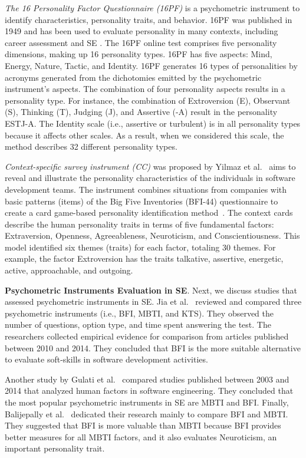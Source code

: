 \textit{The 16 Personality Factor Questionnaire (16PF)} is a psychometric instrument to identify characteristics, personality traits, and behavior. 16PF was published in 1949 and has been used to evaluate personality in many contexts, including career assessment and SE \cite{gomesevaluating}. The 16PF online test comprises five personality dimensions, making up 16 personality types. 16PF has five aspects: Mind, Energy, Nature, Tactic, and Identity. 16PF generates 16 types of personalities by acronyms generated from the dichotomies emitted by the psychometric instrument's aspects. The combination of four personality aspects results in a personality type. For instance, the combination of Extroversion (E), Observant (S), Thinking (T), Judging (J), and Assertive (-A) result in the personality ESTJ-A.  The Identity scale (i.e., assertive or turbulent) is in all personality types because it affects other scales. As a result, when we considered this scale, the method describes 32 different personality types. 

\textit{Context-specific survey instrument (CC)} was proposed by Yilmaz et al.~\cite{yilmaz2017examination} aims to reveal and illustrate the personality characteristics of the individuals in software development teams. The instrument combines situations from companies with basic patterns (items) of the Big Five Inventories (BFI-44) questionnaire to create a card game-based personality identification method~\cite{yilmaz2017examination}. The context cards describe the human personality traits in terms of five fundamental factors: Extraversion, Openness, Agreeableness, Neuroticism, and Conscientiousness.  This model identified six themes (traits) for each factor, totaling 30 themes. For example, the factor Extroversion has the traits talkative, assertive, energetic, active, approachable, and outgoing.
 
 \textbf{Psychometric Instruments Evaluation in SE}. Next, we discuss studies that assessed psychometric instruments in SE. Jia et al.~\cite{jia2015comparative} reviewed and compared three psychometric instruments (i.e., BFI, MBTI, and KTS). They observed the number of questions, option type, and time spent answering the test. The researchers collected empirical evidence for comparison from articles published between 2010 and 2014. They concluded that BFI is the more suitable alternative to evaluate soft-skills in software development activities. 

Another study by Gulati et al.~\cite{gulati2015comparative} compared studies published between 2003 and 2014 that analyzed human factors in software engineering. They concluded that the most popular psychometric instruments in SE are MBTI and BFI. Finally, Balijepally et al.~\cite{balijepally2006assessing} dedicated their research mainly to compare BFI and MBTI. They suggested that BFI is more valuable than MBTI because BFI provides better measures for all MBTI factors, and it also evaluates Neuroticism, an important personality trait. 

